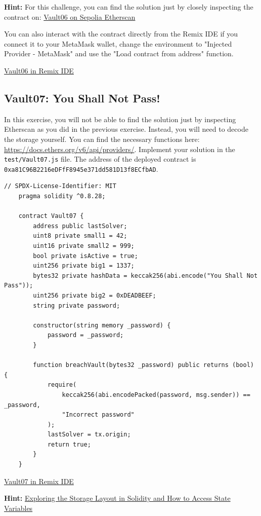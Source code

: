 \documentclass[12pt]{article}
\begin{document}
\medskip
\noindent
\textbf{Hint:} For this challenge, you can find the solution just by closely inspecting the contract on: \href{https://sepolia.etherscan.io/address/0xA3a763bF62550511A0E485d6EB16c98937609A32}{Vault06 on Sepolia Etherscan}

\medskip
\noindent
You can also interact with the contract directly from the Remix IDE if you connect it to your MetaMask wallet, change the environment to "Injected Provider - MetaMask" and use the "Load contract from address" function.

\medskip
\noindent
\href{https://remix.ethereum.org/?#activate=solidity&url=https://github.com/radovluk/unbreakable-vault/contracts/Vault06.sol&lang=en&optimize=false&runs=200&evmVersion=null&version=soljson-v0.8.28+commit.7893614a.js}{Vault06 in Remix IDE}

\subsection*{Vault07: You Shall Not Pass!}

\noindent
In this exercise, you will not be able to find the solution just by inspecting Etherscan as you did in the previous exercise. Instead, you will need to decode the storage yourself. You can find the necessary functions here: \href{https://docs.ethers.org/v6/api/providers/}{https://docs.ethers.org/v6/api/providers/}. Implement your solution in the \texttt{test/Vault07.js} file. The address of the deployed contract is \texttt{0xa81C96B2216eDFfF8945e371dd581D13f8ECfbAD}.

\begin{lstlisting}[language=Solidity]
    // SPDX-License-Identifier: MIT
    pragma solidity ^0.8.28;
    
    contract Vault07 {
        address public lastSolver;
        uint8 private small1 = 42;
        uint16 private small2 = 999;
        bool private isActive = true;
        uint256 private big1 = 1337;
        bytes32 private hashData = keccak256(abi.encode("You Shall Not Pass"));
        uint256 private big2 = 0xDEADBEEF;
        string private password;
    
        constructor(string memory _password) {
            password = _password;
        }
    
        function breachVault(bytes32 _password) public returns (bool) {
            require(
                keccak256(abi.encodePacked(password, msg.sender)) == _password,
                "Incorrect password"
            );
            lastSolver = tx.origin;
            return true;
        }
    }
\end{lstlisting}

\medskip
\noindent
\href{https://remix.ethereum.org/?#activate=solidity&url=https://github.com/radovluk/unbreakable-vault/contracts/Vault07.sol&lang=en&optimize=false&runs=200&evmVersion=null&version=soljson-v0.8.28+commit.7893614a.js}{Vault07 in Remix IDE}

\medskip
\noindent
\textbf{Hint:} \href{https://medium.com/@flores.eugenio03/exploring-the-storage-layout-in-solidity-and-how-to-access-state-variables-bf2cbc6f8018}{Exploring the Storage Layout in Solidity and How to Access State Variables}
\end{document}
